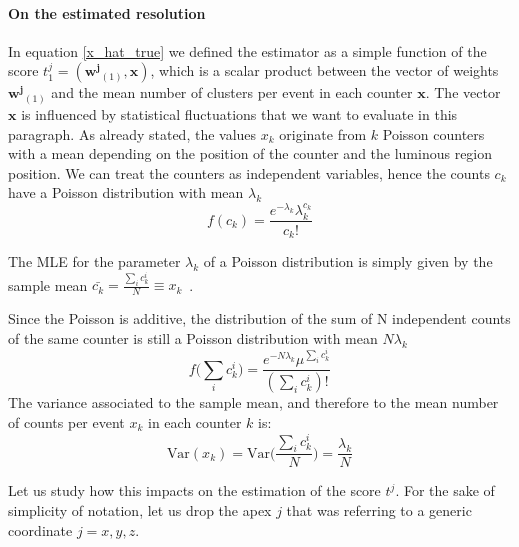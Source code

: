  \paragraph{On the estimated resolution}
 In equation \eqref{x_hat_true} we defined the estimator as a simple function of the score $t^j_1=(\mathbf{w^j}_{(1)},\mathbf{x})$, which is a scalar product between the vector of weights $\mathbf{w^j}_{(1)}$ and the mean number of clusters per event in each counter $\mathbf{x}$. The vector $\mathbf{x}$ is influenced by statistical fluctuations that we want to evaluate in this paragraph. As already stated, the values $x_k$ originate from $k$ Poisson counters with a mean depending on the position of the counter and the luminous region position. We can treat the counters as independent variables, hence the counts $c_k$ have a Poisson distribution with mean $\lambda_k$
 \begin{equation}
     f(c_k) = \frac{e^{-\lambda_k} \lambda_k^{c_k}}{c_k!}
 \end{equation}

The MLE for the parameter $\lambda_k$ of a Poisson distribution is simply given by the sample mean $\bar{c_k}=\tfrac{\sum_i c_k^i}{N} \equiv x_k$~\cite{James:2006zz}. 

 Since the Poisson is additive, the distribution of the sum of N independent counts of the same counter is still a Poisson distribution with mean $N\lambda_k$
 \begin{equation}
     f\bigl(\sum_i c^i_k\bigr) = \frac{e^{-N\lambda_k} \mu^{\sum_i c^i_k}}{(\sum_i c^i_k)!}
 \end{equation}
The variance associated to the sample mean, and therefore to the mean number of counts per event $x_k$ in each counter $k$ is:
\begin{equation}
    \text{Var}(x_k) =\text{Var}\biggl(\frac{\sum_i c^i_k}{N}\biggr) = \frac{\lambda_k}{N}
\end{equation}

Let us study how this impacts on the estimation of the score $t^j$. For the sake of simplicity of notation, let us drop the apex $j$ that was referring to a generic coordinate $j=x,y,z$. 

